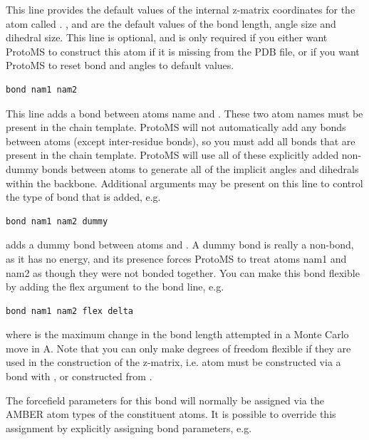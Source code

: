 \documentclass[letterpaper,10pt,english]{sphinxmanual}
\begin{document}
This line provides the default values of the internal z-matrix coordinates for the atom called . ,  and  are the default values of the bond length, angle size and dihedral size. This line is optional, and is only required if you either want ProtoMS to construct this atom if it is missing from the PDB file, or if you want ProtoMS to reset bond and angles to default values.

\begin{Verbatim}[commandchars=\\\{\}]
bond nam1 nam2
\end{Verbatim}

This line adds a bond between atoms name  and . These two atom names must be present in the chain template. ProtoMS will not automatically add any bonds between atoms (except inter-residue bonds), so you must add all bonds that are present in the chain template. ProtoMS will use all of these explicitly added non-dummy bonds between atoms to generate all of the implicit angles and dihedrals within the backbone. Additional arguments may be present on this line to control the type of bond that is added, e.g.

\begin{Verbatim}[commandchars=\\\{\}]
bond nam1 nam2 dummy
\end{Verbatim}

adds a dummy bond between atoms  and . A dummy bond is really a non-bond, as it has no energy, and its presence forces ProtoMS to treat atoms nam1 and nam2 as though they were not bonded together. You can make this bond flexible by adding the flex argument to the bond line, e.g.

\begin{Verbatim}[commandchars=\\\{\}]
bond nam1 nam2 flex delta
\end{Verbatim}

where  is the maximum change in the bond length attempted in a Monte Carlo move in A. Note that you can only make degrees of freedom flexible if they are used in the construction of the z-matrix, i.e. atom  must be constructed via a bond with , or  constructed from .

The forcefield parameters for this bond will normally be assigned via the AMBER atom types of the constituent atoms. It is possible to override this assignment by explicitly assigning bond parameters, e.g.
\end{document}
